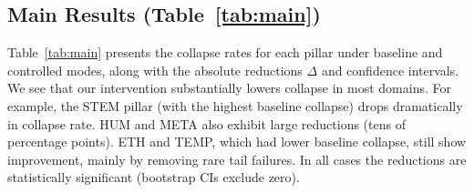 \documentclass{article}
\begin{document}
\subsection{Main Results (Table~\ref{tab:main})}
Table~\ref{tab:main} presents the collapse rates for each pillar under baseline and controlled modes, along with the absolute reductions $\Delta$ and confidence intervals. We see that our intervention substantially lowers collapse in most domains. For example, the STEM pillar (with the highest baseline collapse) drops dramatically in collapse rate. HUM and META also exhibit large reductions (tens of percentage points). ETH and TEMP, which had lower baseline collapse, still show improvement, mainly by removing rare tail failures. In all cases the reductions are statistically significant (bootstrap CIs exclude zero).

\begin{table}[t]
\centering
\scriptsize
\setlength{\tabcolsep}{2.5pt}
\caption{Collapse reduction across five pillars under baseline vs.\ controlled decoding (Gemma~7B, Ollama, 512 tokens fixed).
Rates show Wilson 95\% CIs; $\Delta$/RR/OR use paired bootstrap over seeds (B=20{,}000).}
\label{tab:main}
\end{table}
\end{document}
